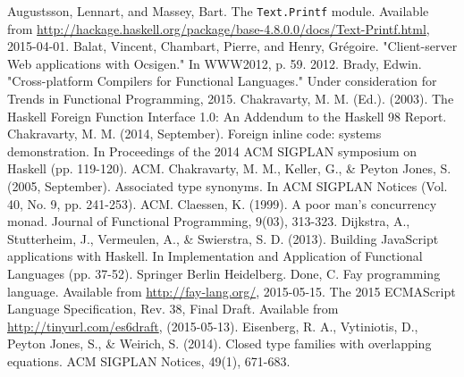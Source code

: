\documentclass{sigplanconf}
\begin{document}




\begin{thebibliography}{}
\softraggedright

  Augustsson, Lennart, and Massey, Bart. The {\tt Text.Printf} module.
  Available from \url{http://hackage.haskell.org/package/base-4.8.0.0/docs/Text-Printf.html},
  2015-04-01.
  Balat, Vincent, Chambart, Pierre, and Henry, Grégoire.
  "Client-server Web applications with Ocsigen." In WWW2012, p. 59. 2012.
  Brady, Edwin.
  "Cross-platform Compilers for Functional Languages."
  Under consideration for Trends in Functional Programming, 2015.
  Chakravarty, M. M. (Ed.). (2003).
  The Haskell Foreign Function Interface 1.0: An Addendum to the Haskell 98
  Report.
  Chakravarty, M. M. (2014, September).
  Foreign inline code: systems demonstration.
  In Proceedings of the 2014 ACM SIGPLAN symposium on Haskell (pp. 119-120).
  ACM.
  Chakravarty, M. M., Keller, G., \& Peyton Jones, S. (2005, September).
  Associated type synonyms.
  In ACM SIGPLAN Notices (Vol. 40, No. 9, pp. 241-253). ACM.
  Claessen, K. (1999).
  A poor man's concurrency monad.
  Journal of Functional Programming, 9(03), 313-323.
  Dijkstra, A., Stutterheim, J., Vermeulen, A., \& Swierstra, S. D. (2013).
  Building JavaScript applications with Haskell.
  In Implementation and Application of Functional Languages (pp. 37-52).
  Springer Berlin Heidelberg.
  Done, C.
  Fay programming language.
  Available from \url{http://fay-lang.org/}, 2015-05-15.
  The 2015 ECMAScript Language Specification, Rev. 38, Final Draft.
  Available from \url{http://tinyurl.com/es6draft},
  (2015-05-13).
  Eisenberg, R. A., Vytiniotis, D., Peyton Jones, S., \& Weirich, S. (2014).
  Closed type families with overlapping equations.
  ACM SIGPLAN Notices, 49(1), 671-683.

\end{thebibliography}
\end{document}

